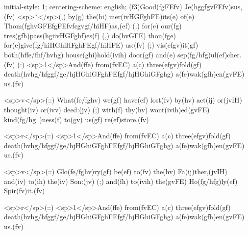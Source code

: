 initial-style: 1;
centering-scheme: english;
(f3)Good(fgFEfv) Je(hggfgvFEfv)sus,(fv) <sp>*</sp>(,) by(g) the(hi) mer(ivHGFghFE)its(e) of(e) Thom(fghvGFEfgFEfvfcgvgf/hiHF)as,(ef) (,) for(e) our(fg) tres(gfh)pass(hgiivHGFghf)es(f) (,) do(hvGFE) thou(fge) for(e)give(fg/hiHGhiHFghFEgf/hiHFE) us:(fv) (;) vis(efgv)it(gf) both(hffe/fhf/hvhg) house(ghi)hold(ivih) door(gf) and(e) sep(fg/hfg)ul(ef)cher.(fv) (:) <sp>1</sp>And(ffe) from(fvEC) a(c) three(efgv)fold(gf) death(hvhg/hfggf/ge/hjHGhiGFghFEfgf/hjHGhiGFghg) a(fe)wak(gfh)en(gvFE) us.(fv)

<sp>v</sp>(::) What(fe/fghv) we(gf) have(ef) lost(fv) by(hv) act(ij) or(jvIH) thought(iv) or(ivv) deed:(jv) (;) with(f) thy(hv) wont(ivih)ed(gvFE) kind(fg/hg~)ness(f) to(gv) us(gf) re(ef)store.(fv)

<sp>r</sp>(::) <sp>1</sp>And(ffe) from(fvEC) a(c) three(efgv)fold(gf) death(hvhg/hfggf/ge/hjHGhiGFghFEfgf/hjHGhiGFghg) a(fe)wak(gfh)en(gvFE) us.(fv)

<sp>v</sp>(::) Glo(fe/fghv)ry(gf) be(ef) to(fv) the(hv) Fa(ij)ther,(jvIH) and(iv) to(ih) the(iv) Son:(jv) (;) and(fh) to(ivih) the(gvFE) Ho(fg/hfg)ly(ef) Spir(fv)it.(fv)

<sp>r</sp>(::) <sp>1</sp>And(ffe) from(fvEC) a(c) three(efgv)fold(gf) death(hvhg/hfggf/ge/hjHGhiGFghFEfgf/hjHGhiGFghg) a(fe)wak(gfh)en(gvFE) us.(fv)